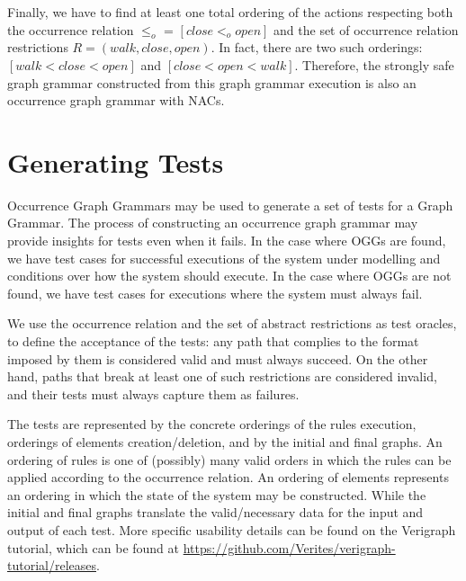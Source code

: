 Finally, we have to find at least one total ordering of the actions respecting both the occurrence relation $\leq_o$ = $[close <_o open]$ and the set of occurrence relation restrictions $R = (walk,close,open)$. In fact, there are two such orderings: $[walk < close < open]$ and $[close < open < walk]$. Therefore, the strongly safe graph grammar constructed from this graph grammar execution is also an occurrence graph grammar with NACs.

\section{Generating Tests}



  Occurrence Graph Grammars may be used to generate a set of tests for a Graph Grammar. The process of constructing an occurrence graph grammar may provide insights for tests even when it fails. In the case where OGGs are found, we have test cases for successful executions of the system under modelling and conditions over how the system should execute. In the case where OGGs are not found, we have test cases for executions where the system must always fail.

We use the occurrence relation and the set of abstract restrictions as test oracles, to define the acceptance of the tests: any path that complies to the format imposed by them is considered valid and must always succeed. On the other hand, paths that break at least one of such restrictions are considered invalid, and their tests must always capture them as failures.

  The tests are represented by the concrete orderings of the rules execution, orderings of elements creation/deletion, and by the initial and final graphs.
  An ordering of rules is one of (possibly) many valid orders in which the rules can be applied according to the occurrence relation. An ordering of elements represents an ordering in which the state of the system may be constructed. While the initial and final graphs translate the valid/necessary data for the input and output of each test. More specific usability details can be found on the Verigraph tutorial, which can be found at \url{https://github.com/Verites/verigraph-tutorial/releases}.


